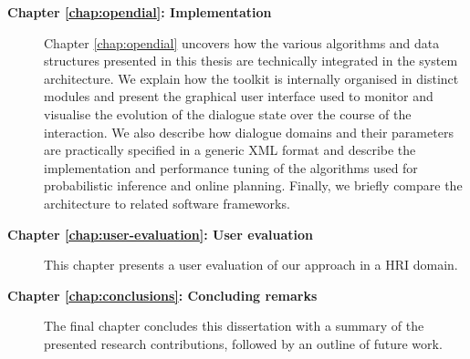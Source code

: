 \begin{description}
\item [\textbf{Chapter \ref{chap:opendial}: Implementation}] \hfill  \vspace{2mm}

Chapter \ref{chap:opendial} uncovers how the various algorithms and data structures presented in this thesis are technically integrated in the system architecture.  We explain how the \opendial toolkit is internally organised in distinct modules and present the graphical user interface used to monitor and visualise the evolution of the dialogue state over the course of the interaction. We also describe how dialogue domains and their parameters are practically specified in a generic XML format and describe the implementation and performance tuning of the algorithms used for probabilistic inference and online planning. Finally, we briefly compare the \opendial architecture to related software frameworks. 

\item [\textbf{Chapter \ref{chap:user-evaluation}: User evaluation}] \hfill  \vspace{2mm}

This chapter presents a user evaluation of our approach in a HRI domain.     \vspace{2mm}


\item [\textbf{Chapter \ref{chap:conclusions}: Concluding remarks}] \hfill  \vspace{2mm}

The final chapter concludes this dissertation with a summary of the presented research contributions, followed by an outline of future work.   \vspace{2mm}

\end{description}

